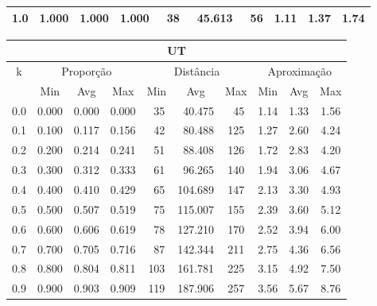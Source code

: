 \begin{table}[!p]
\begin{center}
{\begin{tabular}{|c|c|c|c|c|c|c|c|c|c|}
1.0                & 1.000     & 1.000    & 1.000    & ~38      & ~45.613  & ~56     & 1.11    & 1.37  & 1.74             \\ \hline
\end{tabular}%
\vspace{5pt}
\begin{tabular}{|c|c|c|c|c|c|c|c|c|c|}
\hline
\multicolumn{10}{|c|}{\bf UT}                                                                                             \\ \hline
\multirow{2}{*}{k} & \multicolumn{3}{c|}{Proporção}  & \multicolumn{3}{c|}{Distância} & \multicolumn{3}{c|}{Aproximação}  \\ \cline{2-10}
                   & Min       & Avg      & Max      & Min      & Avg      & Max     & Min     & Avg   & Max              \\ \hline
0.0                & 0.000     & 0.000    & 0.000    & ~35      & ~40.475  & ~45     & 1.14    & 1.33  & 1.56             \\ \hline
0.1                & 0.100     & 0.117    & 0.156    & ~42      & ~80.488  & 125     & 1.27    & 2.60  & 4.24             \\ \hline
0.2                & 0.200     & 0.214    & 0.241    & ~51      & ~88.408  & 126     & 1.72    & 2.83  & 4.20             \\ \hline
0.3                & 0.300     & 0.312    & 0.333    & ~61      & ~96.265  & 140     & 1.94    & 3.06  & 4.67             \\ \hline
0.4                & 0.400     & 0.410    & 0.429    & ~65      & 104.689  & 147     & 2.13    & 3.30  & 4.93             \\ \hline
0.5                & 0.500     & 0.507    & 0.519    & ~75      & 115.007  & 155     & 2.39    & 3.60  & 5.12             \\ \hline
0.6                & 0.600     & 0.606    & 0.619    & ~78      & 127.210  & 170     & 2.52    & 3.94  & 6.00             \\ \hline
0.7                & 0.700     & 0.705    & 0.716    & ~87      & 142.344  & 211     & 2.75    & 4.36  & 6.56             \\ \hline
0.8                & 0.800     & 0.804    & 0.811    & 103      & 161.781  & 225     & 3.15    & 4.92  & 7.50             \\ \hline
0.9                & 0.900     & 0.903    & 0.909    & 119      & 187.906  & 257     & 3.56    & 5.67  & 8.76             \\ \hline

\end{tabular}}
\end{center}
\end{table}

